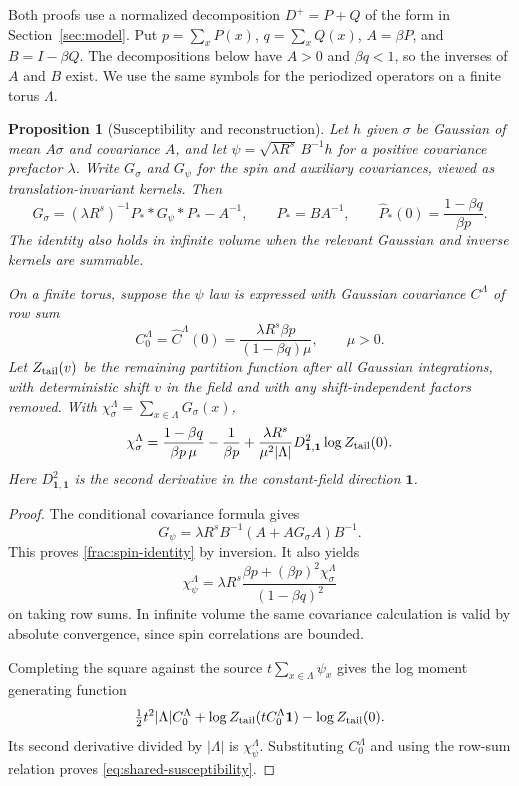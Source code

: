 \documentclass[11pt]{article}
\newtheorem{proposition}{Proposition}[section]
\begin{document}
Both proofs use a normalized decomposition \(D^+=P+Q\) of the
form in Section~\ref{sec:model}. Put \(p=\sum_x P(x)\),
\(q=\sum_x Q(x)\), \(A=\beta P\), and \(B=I-\beta Q\).
The decompositions below have \(A>0\) and \(\beta q<1\), so the
inverses of \(A\) and \(B\) exist. We use the same symbols for
the periodized operators on a finite torus \(\Lambda\).

\begin{proposition}[Susceptibility and reconstruction]
\label{prop:gaussian-spin-identities}
Let \(h\) given \(\sigma\) be Gaussian of mean \(A\sigma\) and
covariance \(A\), and let \(\psi=\sqrt{\lambda R^s}\,B^{-1}h\)
for a positive covariance prefactor \(\lambda\). Write \(G_\sigma\)
and \(G_\psi\) for the spin and auxiliary covariances, viewed as
translation-invariant kernels. Then
\begin{equation}\label{frac:spin-identity}
 G_\sigma=(\lambda R^s)^{-1}P_* *G_\psi*P_*-A^{-1},
 \qquad P_*=BA^{-1},\qquad
 \widehat P_*(0)=\frac{1-\beta q}{\beta p}.
\end{equation}
The identity also holds in infinite volume when the relevant Gaussian
and inverse kernels are summable.

On a finite torus, suppose the \(\psi\) law is expressed with Gaussian
covariance \(C^\Lambda\) of row sum
\[
 C_0^\Lambda=\widehat C^\Lambda(0)
     =\frac{\lambda R^s\beta p}{(1-\beta q)\mu},\qquad \mu>0.
\]
Let \(Z_{\rm tail}(v)\) be the remaining partition function after all
Gaussian integrations, with deterministic shift \(v\) in the field
and with any shift-independent factors removed. With
\(\chi_\sigma^\Lambda=\sum_{x\in\Lambda}G_\sigma(x)\),
\begin{equation}\label{eq:shared-susceptibility}
 \chi_\sigma^\Lambda
 =\frac{1-\beta q}{\beta p\,\mu}-\frac1{\beta p}
   +\frac{\lambda R^s}{\mu^2|\Lambda|}
       D^2_{\boldsymbol1,\boldsymbol1}\log Z_{\rm tail}(0).
\end{equation}
Here \(D^2_{\boldsymbol1,\boldsymbol1}\) is the second derivative
in the constant-field direction \(\boldsymbol1\).
\end{proposition}

\begin{proof}
The conditional covariance formula gives
\[
 G_\psi=\lambda R^s B^{-1}(A+A G_\sigma A)B^{-1}.
\]
This proves \eqref{frac:spin-identity} by inversion. It also yields
\[
 \chi_\psi^\Lambda
   =\lambda R^s\frac{\beta p+(\beta p)^2\chi_\sigma^\Lambda}
                        {(1-\beta q)^2}
\]
on taking row sums. In infinite volume the same covariance calculation
is valid by absolute convergence, since spin correlations are bounded.

Completing the square against the source
\(t\sum_{x\in\Lambda}\psi_x\) gives the log moment generating
function
\[
 \tfrac12 t^2|\Lambda| C_0^\Lambda
  +\log Z_{\rm tail}(tC_0^\Lambda\boldsymbol1)
  -\log Z_{\rm tail}(0).
\]
Its second derivative divided by \(|\Lambda|\) is
\(\chi_\psi^\Lambda\). Substituting \(C_0^\Lambda\) and using the
row-sum relation proves \eqref{eq:shared-susceptibility}.
\end{proof}
\end{document}
